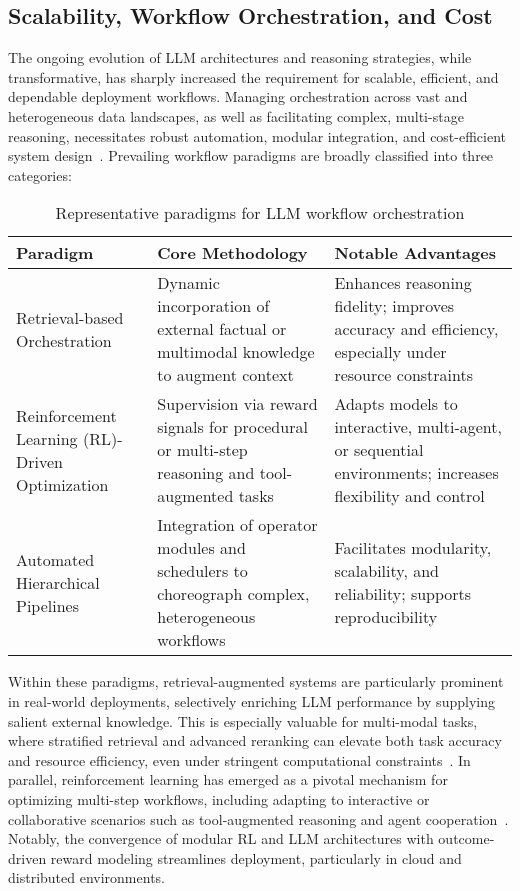 \subsection{Scalability, Workflow Orchestration, and Cost}

The ongoing evolution of LLM architectures and reasoning strategies, while transformative, has sharply increased the requirement for scalable, efficient, and dependable deployment workflows. Managing orchestration across vast and heterogeneous data landscapes, as well as facilitating complex, multi-stage reasoning, necessitates robust automation, modular integration, and cost-efficient system design~\cite{ref5,ref8,ref9,ref12,ref37,ref43,ref50,ref55,ref57,ref60,ref64,ref79,ref80,ref86,ref88,ref89,ref104}. Prevailing workflow paradigms are broadly classified into three categories:

\begin{table*}[htbp]
\centering
\caption{Representative paradigms for LLM workflow orchestration}
\label{tab:workflow_paradigms}
\begin{adjustbox}{max width=\textwidth}
\begin{tabular}{lll}
\toprule
\textbf{Paradigm} & \textbf{Core Methodology} & \textbf{Notable Advantages} \\
\midrule
Retrieval-based Orchestration & Dynamic incorporation of external factual or multimodal knowledge to augment context & Enhances reasoning fidelity; improves accuracy and efficiency, especially under resource constraints~\cite{ref5,ref50,ref79,ref80} \\
Reinforcement Learning (RL)-Driven Optimization & Supervision via reward signals for procedural or multi-step reasoning and tool-augmented tasks & Adapts models to interactive, multi-agent, or sequential environments; increases flexibility and control~\cite{ref8,ref9,ref12,ref37,ref55,ref60,ref64,ref86} \\
Automated Hierarchical Pipelines & Integration of operator modules and schedulers to choreograph complex, heterogeneous workflows & Facilitates modularity, scalability, and reliability; supports reproducibility~\cite{ref12,ref64,ref86,ref79} \\
\bottomrule
\end{tabular}
\end{adjustbox}
\end{table*}

Within these paradigms, retrieval-augmented systems are particularly prominent in real-world deployments, selectively enriching LLM performance by supplying salient external knowledge. This is especially valuable for multi-modal tasks, where stratified retrieval and advanced reranking can elevate both task accuracy and resource efficiency, even under stringent computational constraints~\cite{ref79,ref80,ref89}. In parallel, reinforcement learning has emerged as a pivotal mechanism for optimizing multi-step workflows, including adapting to interactive or collaborative scenarios such as tool-augmented reasoning and agent cooperation~\cite{ref8,ref9,ref12,ref37,ref55,ref60,ref64,ref86}. Notably, the convergence of modular RL and LLM architectures with outcome-driven reward modeling streamlines deployment, particularly in cloud and distributed environments.

